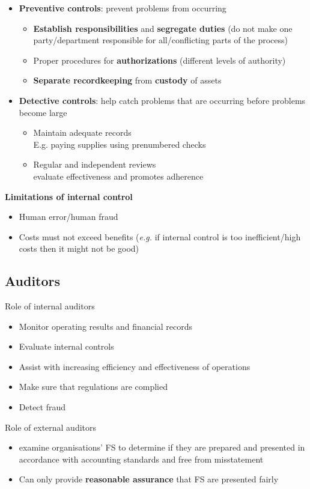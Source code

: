 \documentclass{article}
\newcommand{\eg}[0]{\textit{e.g. }}
\begin{document}
\begin{multicols}{2}
\begin{itemize}
	\item \textbf{Preventive controls}: prevent problems from occurring
	\begin{itemize}
		\item \textbf{Establish responsibilities} and \textbf{segregate duties} (do not make one party/department responsible for all/conflicting parts of the process)
		\item Proper procedures for \textbf{authorizations} (different levels of authority)
		\item \textbf{Separate recordkeeping} from \textbf{custody} of assets
	\end{itemize}
	\item \textbf{Detective controls}: help catch problems that are occurring before problems become large
	\begin{itemize}
		\item Maintain adequate records\\
		E.g. paying supplies using prenumbered checks
		\item Regular and independent reviews\\
		evaluate effectiveness and promotes adherence
	\end{itemize}
\end{itemize}
\textbf{Limitations of internal control}
\begin{itemize}
	\item Human error/human fraud
	\item Costs must not exceed benefits (\eg if internal control is too inefficient/high costs then it might not be good)
\end{itemize}

\subsection{Auditors}
Role of internal auditors
\begin{itemize}
	\item Monitor operating results and financial records
	\item Evaluate internal controls
	\item Assist with increasing efficiency and effectiveness of operations
	\item Make sure that regulations are complied
	\item Detect fraud
\end{itemize}
Role of external auditors
\begin{itemize}
	\item examine organisations' FS to determine if they are prepared and presented in accordance with accounting standards and free from misstatement
	\item Can only provide \textbf{reasonable assurance} that FS are presented fairly
\end{itemize}


\end{multicols}
\end{document}
